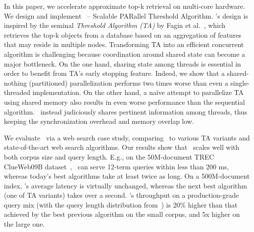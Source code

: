 In this paper, we accelerate approximate top-k retrieval on multi-core hardware. 
We design and implement  \emph{\alg}~-- {Scalable PARallel Threshold Algorithm}.  
%
\alg's design is inspired by the seminal \emph{Threshold Algorithm (TA)} by Fagin et al.~\cite{Fagin:2003}, which
retrieves the top-k objects from a database based on an aggregation of features that may reside in multiple nodes. 
Transforming TA into an efficient concurrent algorithm is challenging because coordination around 
shared state can become a major bottleneck.
On the one hand,
sharing state among threads is essential in order to benefit from TA's early stopping feature.
Indeed, we show  that a shared-nothing (partitioned) parallelization  performs two times 
worse than even a single-threaded implementation. On the other hand, 
a na\"ive attempt to parallelize TA using shared memory also results in even 
worse performance than the sequential algorithm. \alg\ instead judiciously shares pertinent
information among threads, thus keeping the synchronization 
overhead and memory overlap low. 

We evaluate \alg\ via a web search case study, comparing \alg\ to various TA variants and 
state-of-the-art web search algorithms. 
Our results show that \alg\ scales well with both  corpus size and query length.
E.g., on the 50M-document TREC ClueWeb09B dataset~\cite{ClueWeb09}, 
\alg\ can serve  12-term queries within less than 200 ms, 
whereas today's best algorithms  take at least twice as long.
%
On a 500M-document index,  \alg's average latency is virtually unchanged, whereas the next best algorithm (one of TA variants)
takes over a second. 
 \alg's throughput on a production-grade query mix (with the query length distribution from~\cite{sigir/Guy16}) is 
20\% higher than that achieved by the best previous algorithm on the small corpus, and 5x higher  on the large one.

